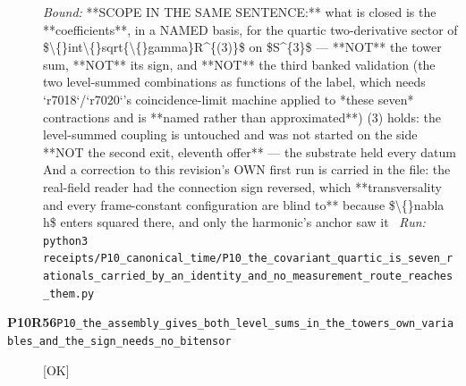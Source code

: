 \begin{description}
 \emph{Bound:}  **SCOPE IN THE SAME SENTENCE:** what is closed is the **coefficients**, in a NAMED basis, for the quartic two-derivative sector of \$\textbackslash\{\}int\textbackslash\{\}sqrt\{\textbackslash\{\}gamma\}R\textasciicircum{}\{(3)\}\$ on \$S\textasciicircum{}\{3\}\$ --- **NOT** the tower sum, **NOT** its sign, and **NOT** the third banked validation (the two level-summed combinations as functions of the label, which needs `r7018`/`r7020`'s coincidence-limit machine applied to *these seven* contractions and is **named rather than approximated**)  (3) holds: the level-summed coupling is untouched and was not started on the side  **NOT the second exit, eleventh offer** --- the substrate held every datum  And a correction to this revision's OWN first run is carried in the file: the real-field reader had the connection sign reversed, which **transversality and every frame-constant configuration are blind to** because \$\textbackslash\{\}nabla h\$ enters squared there, and only the harmonic's anchor saw it
\ \emph{Run:} \texttt{python3 receipts/P10\_canonical\_time/P10\_the\_covariant\_quartic\_is\_seven\_rationals\_carried\_by\_an\_identity\_and\_no\_measurement\_route\_reaches\_them.py}
\item[\rcptlabel{P10_the_assembly_gives_both_level_sums_in_the_towers_own_variables_and_the_sign_needs_no_bitensor}{P10R56}\textbf{P10R56}\quad\texttt{P10\_the\_assembly\_gives\_both\_level\_sums\_in\_the\_towers\_own\_variables\_and\_the\_sign\_needs\_no\_bitensor}]\hfill\textsf{[OK]}\\

\end{description}

